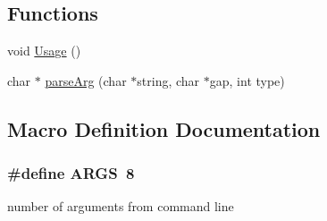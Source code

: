 \subsection*{Functions}
\begin{DoxyCompactItemize}
\item 
void \hyperlink{optjrParam__helper_8hh_a5ae07f63d6b390e42068d941038dadf2}{Usage} ()
\item 
char $\ast$ \hyperlink{optjrParam__helper_8hh_a7f9e2be22b56862eb593a40550cff1dc}{parse\-Arg} (char $\ast$string, char $\ast$gap, int type)
\end{DoxyCompactItemize}


\subsection{Macro Definition Documentation}
\hypertarget{optjrParam__helper_8hh_aff1b09d6630c6c0942f78171e74c1b9d}{
\subsubsection[{A\-R\-G\-S}]{\setlength{\rightskip}{0pt plus 5cm}\#define A\-R\-G\-S~8}}\label{optjrParam__helper_8hh_aff1b09d6630c6c0942f78171e74c1b9d}


number of arguments from command line 

